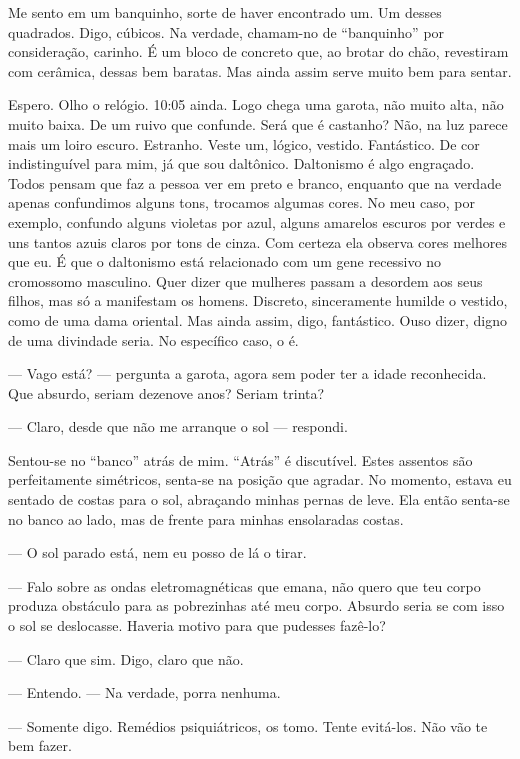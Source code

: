 Me sento em um banquinho, sorte de haver encontrado um. Um desses quadrados. Digo, cúbicos. Na verdade, cha\-mam-no de ``banquinho'' por consideração, carinho. É um blo\-co de concreto que, ao brotar do chão, revestiram com cerâmica, dessas bem baratas. Mas ainda assim serve muito bem para sentar.

Espero. Olho o relógio. 10:05 ainda. Logo chega uma garota, não muito alta, não muito baixa. De um ruivo que confunde. Será que é castanho? Não, na luz parece mais um loiro escuro. Estranho. Veste um, lógico, vestido. Fantástico. De cor indistinguível para mim, já que sou daltônico. Daltonismo é algo engraçado. Todos pensam que faz a pessoa ver em preto e branco, enquanto que na verdade apenas confundimos alguns tons, trocamos algumas cores. No meu caso, por exemplo, confundo alguns violetas por azul, alguns amarelos escuros por verdes e uns tantos azuis claros por tons de cinza. Com certeza ela observa cores melhores que eu. É que o daltonismo está relacionado com um gene recessivo no cromossomo masculino. Quer dizer que mulheres passam a desordem aos seus filhos, mas só a manifestam os homens. Discreto, sinceramente humilde o vestido, como de uma dama oriental. Mas ainda assim, digo, fantástico. Ouso dizer, digno de uma divindade seria. No específico caso, o é.

--- Vago está? --- pergunta a garota, agora sem poder ter a idade reconhecida. Que absurdo, seriam dezenove anos? Seriam trinta?

--- Claro, desde que não me arranque o sol --- respondi.

Sentou-se no ``banco'' atrás de mim. ``Atrás'' é discutível. Estes assentos são perfeitamente simétricos, senta-se na posição que agradar. No momento, estava eu sentado de costas para o sol, abraçando minhas pernas de leve. Ela então senta-se no banco ao lado, mas de frente para minhas ensolaradas costas.

--- O sol parado está, nem eu posso de lá o tirar.

--- Falo sobre as ondas eletromagnéticas que emana, não quero que teu corpo produza obstáculo para as pobrezinhas até meu corpo. Absurdo seria se com isso o sol se deslocasse. Haveria motivo para que pudesses fazê-lo?

--- Claro que sim. Digo, claro que não.

--- Entendo. --- Na verdade, porra nenhuma.

--- Somente digo. Remédios psiquiátricos, os tomo. Tente evitá-los. Não vão te bem fazer.

